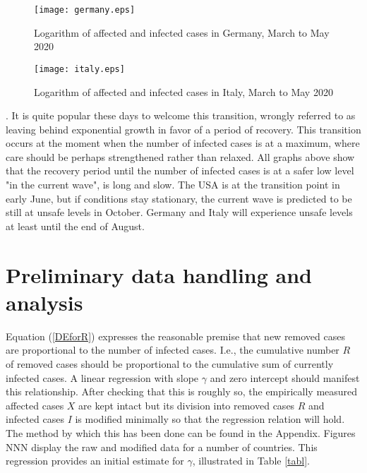 \documentclass{article}
\begin{document}
\begin{figure}
\begin{center}
{\texttt{[image: germany.eps]}}
\end{center}
\caption{Logarithm of affected and infected cases in Germany, March to May 2020}
\label{germany}
\end{figure}

\begin{figure}
\begin{center}
{\texttt{[image: italy.eps]}}
\end{center}
\caption{Logarithm of affected and infected cases in Italy, March to May 2020}
\label{italy}
\end{figure}

. It is quite popular these days to welcome this transition, wrongly referred to as leaving behind exponential growth in favor of a period of recovery. This transition occurs at the moment when the number of infected cases is at a maximum, where care should be perhaps strengthened rather than relaxed. All graphs above show that the recovery period until the number of infected cases is at a safer low level "in the current wave", is long and slow.  The USA is at the transition point in early June, but if conditions stay stationary, the current wave is predicted to be still at unsafe levels in October. Germany and Italy will experience unsafe levels at least until the end of August.

\section{Preliminary data handling and analysis} \label{preliminarysection}

Equation (\ref{DEforR}) expresses the reasonable premise that new removed cases are proportional to the number of infected cases. I.e., the cumulative number $R$ of removed cases should be proportional to the cumulative sum of currently infected cases. A linear regression with slope $\gamma$ and zero intercept should manifest this relationship. After checking that this is roughly so, the empirically measured affected cases $X$ are kept intact but its division into removed cases $R$ and infected cases $I$ is modified minimally so that the regression relation will hold. The method by which this has been done can be found in the Appendix. Figures NNN display the raw and modified data for a number of countries. This regression provides an initial estimate for $\gamma$, illustrated in Table \ref{tabl}.
\end{document}
